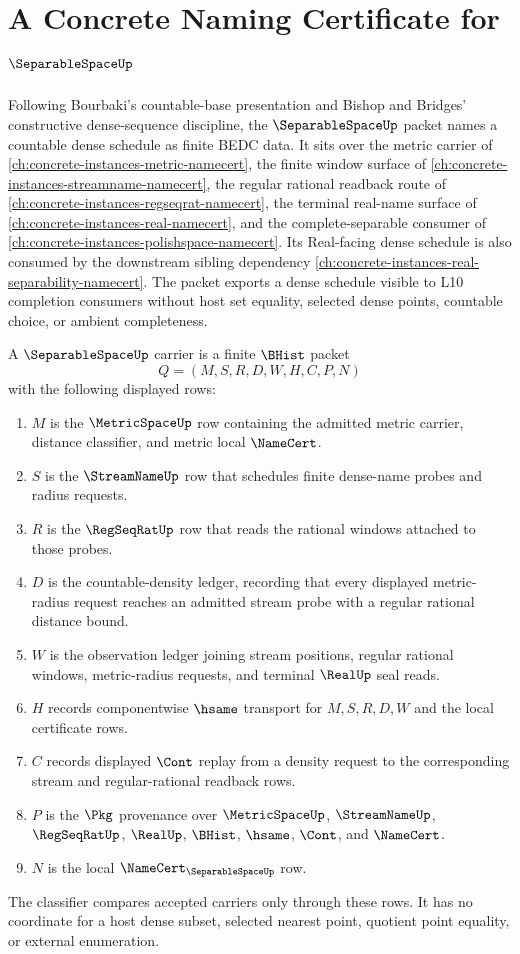 \chapter{A Concrete Naming Certificate for $\SeparableSpaceUp$}
\label{ch:concrete-instances-separable-space-namecert}

Following Bourbaki's countable-base presentation and Bishop and Bridges'
constructive dense-sequence discipline, the $\SeparableSpaceUp$ packet names a
countable dense schedule as finite BEDC data. It sits over the metric carrier
of \autoref{ch:concrete-instances-metric-namecert}, the finite window surface
of \autoref{ch:concrete-instances-streamname-namecert}, the regular rational
readback route of \autoref{ch:concrete-instances-regseqrat-namecert}, the
terminal real-name surface of \autoref{ch:concrete-instances-real-namecert},
and the complete-separable consumer of
\autoref{ch:concrete-instances-polishspace-namecert}. Its Real-facing dense
schedule is also consumed by the downstream sibling dependency
\autoref{ch:concrete-instances-real-separability-namecert}. The packet exports
a dense schedule visible to L10 completion consumers without host set equality,
selected dense points, countable choice, or ambient completeness.

\begin{definition}
\label{def:separable-space-carrier}
A $\SeparableSpaceUp$ carrier is a finite $\BHist$ packet
$$
Q=(M,S,R,D,W,H,C,P,N)
$$
with the following displayed rows:
\begin{enumerate}
\item $M$ is the $\MetricSpaceUp$ row containing the admitted metric carrier,
distance classifier, and metric local $\NameCert$.
\item $S$ is the $\StreamNameUp$ row that schedules finite dense-name probes
and radius requests.
\item $R$ is the $\RegSeqRatUp$ row that reads the rational windows attached
to those probes.
\item $D$ is the countable-density ledger, recording that every displayed
metric-radius request reaches an admitted stream probe with a regular rational
distance bound.
\item $W$ is the observation ledger joining stream positions, regular
rational windows, metric-radius requests, and terminal $\RealUp$ seal reads.
\item $H$ records componentwise $\hsame$ transport for $M,S,R,D,W$ and the
local certificate rows.
\item $C$ records displayed $\Cont$ replay from a density request to the
corresponding stream and regular-rational readback rows.
\item $P$ is the $\Pkg$ provenance over $\MetricSpaceUp$, $\StreamNameUp$,
$\RegSeqRatUp$, $\RealUp$, $\BHist$, $\hsame$, $\Cont$, and $\NameCert$.
\item $N$ is the local $\NameCert_{\SeparableSpaceUp}$ row.
\end{enumerate}
The classifier compares accepted carriers only through these rows. It has no
coordinate for a host dense subset, selected nearest point, quotient point
equality, or external enumeration.
\end{definition}

